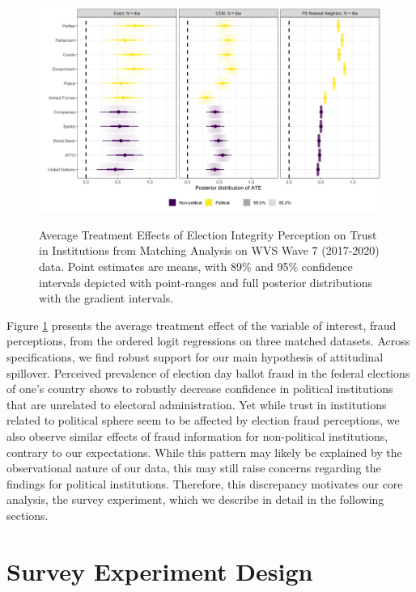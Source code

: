 \documentclass[11pt, ngerman,english,a4]{article}
\begin{document}
\begin{figure}[t]
    \centering
    \includegraphics[width=\linewidth,trim=4 4 4 4,clip]{figs/matching.png}\\
    \caption{Average Treatment Effects of Election Integrity Perception on Trust in Institutions from Matching Analysis on WVS Wave 7 (2017-2020) data. Point estimates are means, with 89\% and 95\% confidence intervals depicted with point-ranges and full posterior distributions with the gradient intervals.} 
    \label{fig:matching}
\end{figure}

Figure \ref{fig:matching} presents the average treatment effect of the variable of interest, fraud perceptions, from the ordered logit regressions on three matched datasets. Across specifications, we find robust support for our main hypothesis of attitudinal spillover. Perceived prevalence of election day ballot fraud in the federal elections of one's country shows to robustly decrease confidence in political institutions that are unrelated to electoral administration. Yet while trust in institutions related to political sphere seem to be affected by election fraud perceptions, we also observe similar effects of fraud information for non-political institutions, contrary to our expectations. While this pattern may likely be explained by the observational nature of our data, this may still raise concerns regarding the findings for political institutions. Therefore, this discrepancy motivates our core analysis, the survey experiment, which we describe in detail in the following sections. 



\newpage
\section*{Survey Experiment Design}
\end{document}
